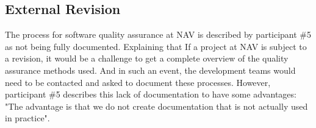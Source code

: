 




\subsection{External Revision} \label{sec:external_revision}
The process for software quality assurance at NAV is described by participant \#5 as not being fully documented. Explaining that If a project at NAV is subject to a revision, it would be a challenge to get a complete overview of the quality assurance methods used. And in such an event, the development teams would need to be contacted and asked to document these processes. However, participant \#5 describes this lack of documentation to have some advantages: "The advantage is that we do not create documentation that is not actually used in practice".

